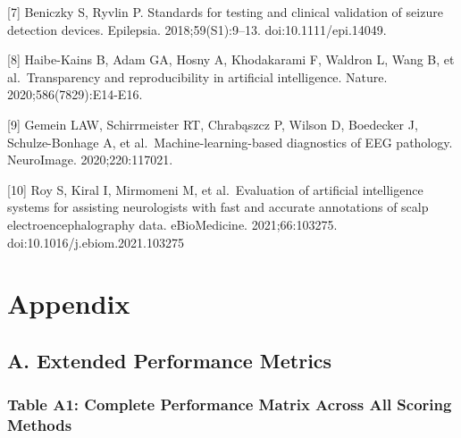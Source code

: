 \documentclass[
  10pt,
]{article}
\begin{document}
{[}7{]} Beniczky S, Ryvlin P. Standards for testing and clinical
validation of seizure detection devices. Epilepsia. 2018;59(S1):9--13.
doi:10.1111/epi.14049.

{[}8{]} Haibe-Kains B, Adam GA, Hosny A, Khodakarami F, Waldron L, Wang
B, et al.~Transparency and reproducibility in artificial intelligence.
Nature. 2020;586(7829):E14-E16.

{[}9{]} Gemein LAW, Schirrmeister RT, Chrabąszcz P, Wilson D, Boedecker
J, Schulze-Bonhage A, et al.~Machine-learning-based diagnostics of EEG
pathology. NeuroImage. 2020;220:117021.

{[}10{]} Roy S, Kiral I, Mirmomeni M, et al.~Evaluation of artificial
intelligence systems for assisting neurologists with fast and accurate
annotations of scalp electroencephalography data. eBioMedicine.
2021;66:103275. doi:10.1016/j.ebiom.2021.103275

\hypertarget{appendix}{%
\section{Appendix}\label{appendix}}

\hypertarget{a.-extended-performance-metrics}{%
\subsection{A. Extended Performance
Metrics}\label{a.-extended-performance-metrics}}

\hypertarget{table-a1-complete-performance-matrix-across-all-scoring-methods}{%
\subsubsection{Table A1: Complete Performance Matrix Across All Scoring
Methods}\label{table-a1-complete-performance-matrix-across-all-scoring-methods}}
\end{document}
